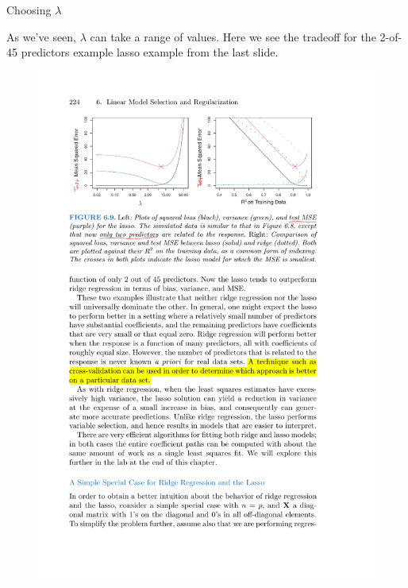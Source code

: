 \documentclass[mathserif, aspectratio=169]{beamer}
\begin{document}
\begin{frame}{Choosing $\lambda$}

As we've seen, $\lambda$ can take a range of values.  Here we see the tradeoff for the 2-of-45 predictors example  lasso example from the last slide. 


\begin{figure}
\includegraphics[scale=.85]{bias-variance-lasso-2}

\end{figure}
\end{frame}
\end{document}
